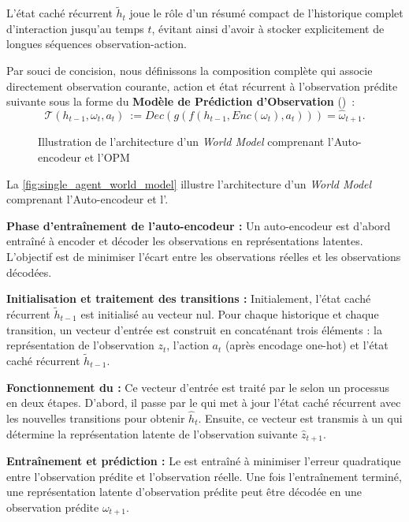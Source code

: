 L'état caché récurrent $\tilde{h}_t$ joue le rôle d'un résumé compact de l'historique complet d'interaction jusqu'au temps $t$, évitant ainsi d'avoir à stocker explicitement de longues séquences observation-action.

Par souci de concision, nous définissons la composition complète qui associe directement observation courante, action et état récurrent à l'observation prédite suivante sous la forme du \textbf{Modèle de Prédiction d'Observation} ()~:
\[
    \mathcal{T}(h_{t-1}, \omega_t, a_t)~:= Dec(g(f(h_{t-1}, Enc(\omega_t), a_t))) = \hat{\omega}_{t+1}.
\]

\begin{figure}[h!]
    \centering
    \resizebox{\textwidth}{!}{%
        
    }
    \caption{Illustration de l'architecture d'un \textit{World Model} comprenant l'Auto-encodeur et l'OPM}
    \label{fig:single_agent_world_model}
\end{figure}

La \autoref{fig:single_agent_world_model} illustre l'architecture d'un \textit{World Model} comprenant l'Auto-encodeur et l'.

\textbf{Phase d'entraînement de l'auto-encodeur :} Un auto-encodeur est d'abord entraîné à encoder et décoder les observations en représentations latentes. L'objectif est de minimiser l'écart entre les observations réelles et les observations décodées.

\textbf{Initialisation et traitement des transitions :} Initialement, l'état caché récurrent $\tilde{h}_{t-1}$ est initialisé au vecteur nul. Pour chaque historique et chaque transition, un vecteur d'entrée est construit en concaténant trois éléments : la représentation de l'observation $z_t$, l'action $a_t$ (après encodage one-hot) et l'état caché récurrent $\tilde{h}_{t-1}$.

\textbf{Fonctionnement du  :} Ce vecteur d'entrée est traité par le  selon un processus en deux étapes. D'abord, il passe par le  qui met à jour l'état caché récurrent avec les nouvelles transitions pour obtenir $\hat{h}_t$. Ensuite, ce vecteur est transmis à un  qui détermine la représentation latente de l'observation suivante $\hat{z}_{t+1}$.

\textbf{Entraînement et prédiction :} Le  est entraîné à minimiser l'erreur quadratique entre l'observation prédite et l'observation réelle. Une fois l'entraînement terminé, une représentation latente d'observation prédite peut être décodée en une observation prédite $\omega_{t+1}$.

